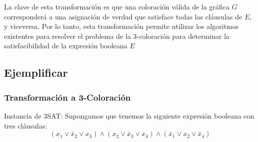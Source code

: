 La clave de esta transformación es que una coloración válida de la gráfica $G$ corresponderá a una asignación 
de verdad que satisface todas las cláusulas de $E$, y viceversa. Por lo tanto, esta transformación permite 
utilizar los algoritmos existentes para resolver el problema de la 3-coloración para determinar la satisfacibilidad
de la expresión booleana $E$


\subsection{\textcolor{Contraste4}{Ejemplificar}}

\subsubsection*{\textcolor{Contraste3}{Transformación a 3-Coloración}}

Instancia de 3SAT: Supongamos que tenemos la siguiente expresión booleana con tres cláusulas:
\begin{equation*}
    (x_1 \vee \bar{x}_2 \vee x_3) \wedge (x_2 \vee \bar{x}_3 \vee x_4) \wedge (\bar{x}_1 \vee x_2 \vee  \bar{x}_4)
\end{equation*}

